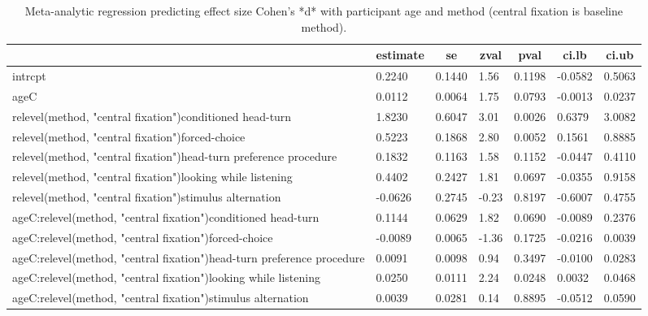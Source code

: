 \documentclass[english,floatsintext,man]{apa6}
\begin{document}
\begin{table}[tbp]
\begin{center}
\begin{threeparttable}
\caption{Meta-analytic regression predicting effect size Cohen's *d* with participant age and method (central fixation is baseline method).}
\begin{tabular}{lllllll}
\toprule
 & \multicolumn{1}{c}{estimate} & \multicolumn{1}{c}{se} & \multicolumn{1}{c}{zval} & \multicolumn{1}{c}{pval} & \multicolumn{1}{c}{ci.lb} & \multicolumn{1}{c}{ci.ub}\\
\midrule
intrcpt & 0.2240 & 0.1440 & 1.56 & 0.1198 & -0.0582 & 0.5063\\
ageC & 0.0112 & 0.0064 & 1.75 & 0.0793 & -0.0013 & 0.0237\\
relevel(method, "central fixation")conditioned head-turn & 1.8230 & 0.6047 & 3.01 & 0.0026 & 0.6379 & 3.0082\\
relevel(method, "central fixation")forced-choice & 0.5223 & 0.1868 & 2.80 & 0.0052 & 0.1561 & 0.8885\\
relevel(method, "central fixation")head-turn preference procedure & 0.1832 & 0.1163 & 1.58 & 0.1152 & -0.0447 & 0.4110\\
relevel(method, "central fixation")looking while listening & 0.4402 & 0.2427 & 1.81 & 0.0697 & -0.0355 & 0.9158\\
relevel(method, "central fixation")stimulus alternation & -0.0626 & 0.2745 & -0.23 & 0.8197 & -0.6007 & 0.4755\\
ageC:relevel(method, "central fixation")conditioned head-turn & 0.1144 & 0.0629 & 1.82 & 0.0690 & -0.0089 & 0.2376\\
ageC:relevel(method, "central fixation")forced-choice & -0.0089 & 0.0065 & -1.36 & 0.1725 & -0.0216 & 0.0039\\
ageC:relevel(method, "central fixation")head-turn preference procedure & 0.0091 & 0.0098 & 0.94 & 0.3497 & -0.0100 & 0.0283\\
ageC:relevel(method, "central fixation")looking while listening & 0.0250 & 0.0111 & 2.24 & 0.0248 & 0.0032 & 0.0468\\
ageC:relevel(method, "central fixation")stimulus alternation & 0.0039 & 0.0281 & 0.14 & 0.8895 & -0.0512 & 0.0590\\
\bottomrule
\end{tabular}
\end{threeparttable}
\end{center}
\end{table}
\end{document}
